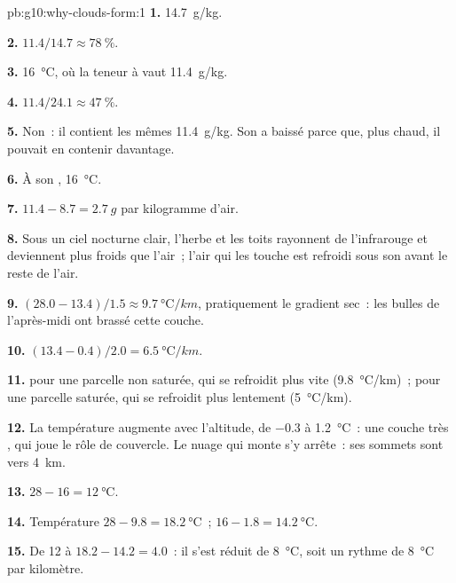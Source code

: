 \begin{solution}{pb:g10:why-clouds-form:1}
\textbf{1.} \qty{14.7}{g/kg}.

\textbf{2.} $11.4/14.7 \approx \qty{78}{\percent}$.

\textbf{3.} \qty{16}{\degreeCelsius}, où la teneur à  vaut
\qty{11.4}{g/kg}.

\textbf{4.} $11.4/24.1 \approx \qty{47}{\percent}$.

\textbf{5.} Non~: il contient les mêmes \qty{11.4}{g/kg}. Son  a baissé parce que, plus chaud, il pouvait en contenir davantage.

\textbf{6.} À son , \qty{16}{\degreeCelsius}.

\textbf{7.} $11.4 - 8.7 = \qty{2.7}{g}$ par kilogramme d'air.

\textbf{8.} Sous un ciel nocturne clair, l'herbe et les toits rayonnent de
l'infrarouge et deviennent plus froids que l'air~; l'air qui les touche est
refroidi sous son  avant le reste de l'air.

\textbf{9.} $(28.0 - 13.4)/1.5 \approx \qty{9.7}{\degreeCelsius/km}$,
pratiquement le gradient sec~: les bulles de l'après-midi ont brassé cette
couche.

\textbf{10.} $(13.4 - 0.4)/2.0 = \qty{6.5}{\degreeCelsius/km}$.

\textbf{11.}  pour une parcelle non saturée, qui se refroidit plus
vite (\qty{9.8}{\degreeCelsius/km})~;  pour une parcelle saturée,
qui se refroidit plus lentement (\qty{5}{\degreeCelsius/km}).

\textbf{12.} La température augmente avec l'altitude, de \num{-0.3} à
\qty{1.2}{\degreeCelsius}~: une couche très , qui joue le rôle de
couvercle. Le nuage qui monte s'y arrête~: ses sommets sont vers
\qty{4}{km}.

\textbf{13.} $28 - 16 = \qty{12}{\degreeCelsius}$.

\textbf{14.} Température $28 - 9.8 = \qty{18.2}{\degreeCelsius}$~;  $16 - 1.8 = \qty{14.2}{\degreeCelsius}$.

\textbf{15.} De 12 à $18.2 - 14.2 = 4.0$~: il s'est réduit de
\qty{8}{\degreeCelsius}, soit un rythme de \qty{8}{\degreeCelsius} par
kilomètre.


\end{solution}
